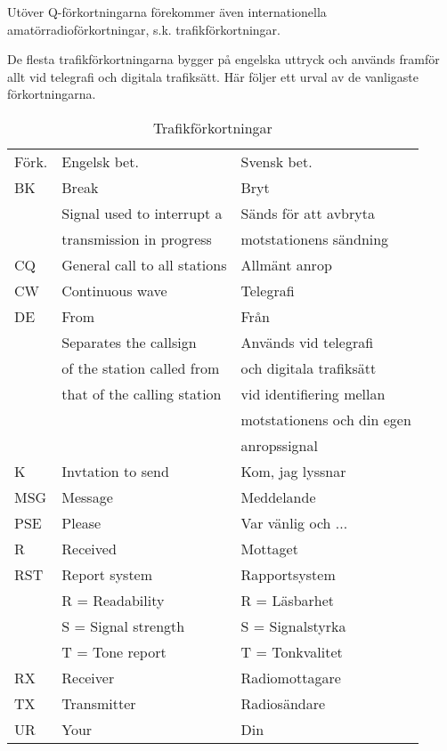 Utöver Q-förkortningarna förekommer även internationella
amatörradioförkortningar, s.k. trafikförkortningar.

De flesta trafikförkortningarna bygger på engelska uttryck och används
framför allt vid telegrafi och digitala trafiksätt. Här följer ett
urval av de vanligaste förkortningarna.

\begin{table}[h]
  \begin{tabular}{lll}
    Förk. & Engelsk bet. & Svensk bet.\\
    BK & Break & Bryt\\
    & Signal used to interrupt a & Sänds för att avbryta\\
    & transmission in progress  & motstationens sändning\\
    CQ & General call to all stations & Allmänt anrop\\
    CW & Continuous wave & Telegrafi\\
    DE & From & Från\\
    & Separates the callsign      & Används vid telegrafi \\
    & of the station called from  & och digitala trafiksätt\\
    & that of the calling station & vid identifiering mellan\\
    &                             & motstationens och din egen\\
    &                             & anropssignal\\
    K & Invtation to send & Kom, jag lyssnar\\
    MSG & Message & Meddelande\\
    PSE & Please & Var vänlig och ...\\
    R & Received & Mottaget\\
    RST & Report system & Rapportsystem\\
    & R = Readability & R = Läsbarhet\\
    & S = Signal strength & S = Signalstyrka\\
    & T = Tone report & T = Tonkvalitet\\
    RX & Receiver & Radiomottagare\\
    TX & Transmitter & Radiosändare\\
    UR & Your & Din\\
  \end{tabular}
  \caption{Trafikförkortningar}
  \label{tab:trafikforkortningar}
\end{table}

